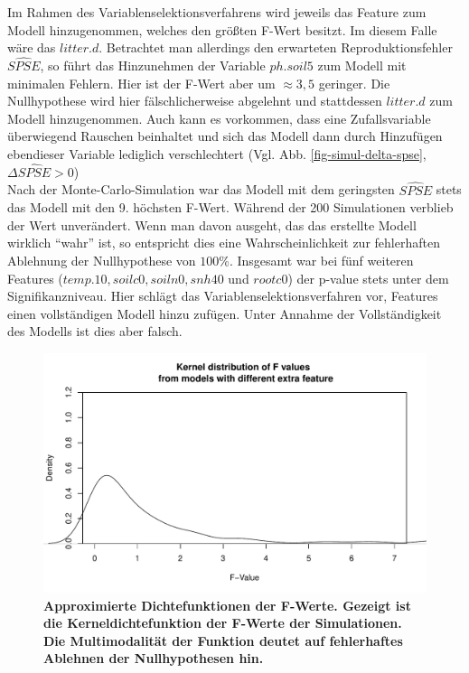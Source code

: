 Im Rahmen des Variablenselektionsverfahrens wird jeweils das Feature zum Modell hinzugenommen, welches den größten F-Wert besitzt.
Im diesem Falle wäre das $litter.d$.
Betrachtet man allerdings den erwarteten Reproduktionsfehler $\widehat{SPSE}$, so führt das Hinzunehmen der Variable $ph.soil5$ zum Modell mit minimalen Fehlern.
Hier ist der F-Wert aber um $\approx 3,5$ geringer.
Die Nullhypothese wird hier fälschlicherweise abgelehnt und stattdessen $litter.d$ zum Modell hinzugenommen.
Auch kann es vorkommen, dass eine Zufallsvariable überwiegend Rauschen beinhaltet und sich das Modell dann durch Hinzufügen ebendieser Variable lediglich verschlechtert (Vgl. Abb. \ref{fig-simul-delta-spse}, $\Delta \widehat{SPSE} > 0$)
\\
Nach der Monte-Carlo-Simulation war das Modell mit dem geringsten $\widehat{SPSE}$ stets das Modell mit den 9. höchsten F-Wert.
Während der 200 Simulationen verblieb der Wert unverändert.
Wenn man davon ausgeht, das das erstellte Modell wirklich "`wahr"' ist, so entspricht dies eine Wahrscheinlichkeit zur fehlerhaften Ablehnung der Nullhypothese von $100\%$.
Insgesamt war bei fünf weiteren Features ($temp.10, soilc0, soiln0, snh40$ und $ rootc0$) der p-value stets unter dem Signifikanzniveau.
Hier schlägt das Variablenselektionsverfahren vor, Features einen vollständigen Modell hinzu zufügen.
Unter Annahme der Vollständigkeit des Modells ist dies aber falsch.
\\
\begin{figure}[htbp]
	\centering
	\includegraphics[width=\textwidth]{fig/simul/kernel.pdf}
	\caption{\bf{Approximierte Dichtefunktionen der F-Werte.} 
		Gezeigt ist die Kerneldichtefunktion der F-Werte der Simulationen.
		Die Multimodalität der Funktion deutet auf fehlerhaftes Ablehnen der Nullhypothesen hin.
	}
	\label{fig-simul-kernel}
\end{figure}

